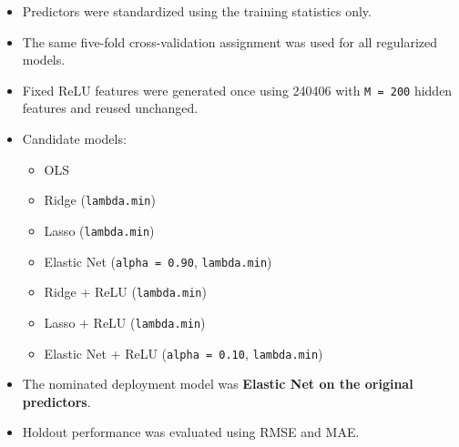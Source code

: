 \documentclass[
  11pt,
]{article}
\providecommand{\tightlist}{%
  \setlength{\itemsep}{0pt}\setlength{\parskip}{0pt}}
\begin{document}
\begin{itemize}
\tightlist
\item
  Predictors were standardized using the training statistics only.
\item
  The same five-fold cross-validation assignment was used for all
  regularized models.
\item
  Fixed ReLU features were generated once using 240406 with
  \texttt{M\ =\ 200} hidden features and reused unchanged.
\item
  Candidate models:

  \begin{itemize}
  \tightlist
  \item
    OLS
  \item
    Ridge (\texttt{lambda.min})
  \item
    Lasso (\texttt{lambda.min})
  \item
    Elastic Net (\texttt{alpha\ =\ 0.90}, \texttt{lambda.min})
  \item
    Ridge + ReLU (\texttt{lambda.min})
  \item
    Lasso + ReLU (\texttt{lambda.min})
  \item
    Elastic Net + ReLU (\texttt{alpha\ =\ 0.10}, \texttt{lambda.min})
  \end{itemize}
\item
  The nominated deployment model was \textbf{Elastic Net on the original
  predictors}.
\item
  Holdout performance was evaluated using RMSE and MAE.
\end{itemize}
\end{document}
